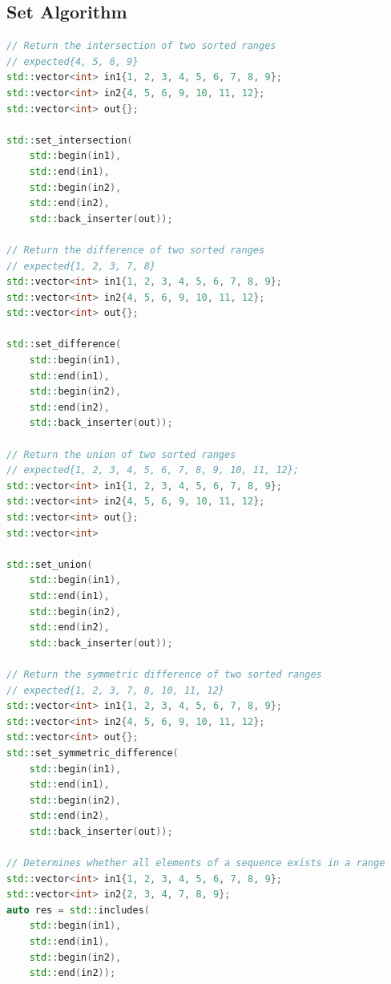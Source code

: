 \subsection{Set Algorithm}
\begin{lstlisting}[language=C++, caption=Set Algorithm]
// Return the intersection of two sorted ranges
// expected{4, 5, 6, 9}
std::vector<int> in1{1, 2, 3, 4, 5, 6, 7, 8, 9};
std::vector<int> in2{4, 5, 6, 9, 10, 11, 12};
std::vector<int> out{};

std::set_intersection(
	std::begin(in1),
	std::end(in1),
	std::begin(in2),
	std::end(in2),
	std::back_inserter(out));
	
// Return the difference of two sorted ranges
// expected{1, 2, 3, 7, 8}
std::vector<int> in1{1, 2, 3, 4, 5, 6, 7, 8, 9};
std::vector<int> in2{4, 5, 6, 9, 10, 11, 12};
std::vector<int> out{};

std::set_difference(
	std::begin(in1),
	std::end(in1),
	std::begin(in2),
	std::end(in2),
	std::back_inserter(out));
	
// Return the union of two sorted ranges
// expected{1, 2, 3, 4, 5, 6, 7, 8, 9, 10, 11, 12};
std::vector<int> in1{1, 2, 3, 4, 5, 6, 7, 8, 9};
std::vector<int> in2{4, 5, 6, 9, 10, 11, 12};
std::vector<int> out{};
std::vector<int> 

std::set_union(
	std::begin(in1),
	std::end(in1),
	std::begin(in2),
	std::end(in2),
	std::back_inserter(out));
	
// Return the symmetric difference of two sorted ranges
// expected{1, 2, 3, 7, 8, 10, 11, 12}
std::vector<int> in1{1, 2, 3, 4, 5, 6, 7, 8, 9};
std::vector<int> in2{4, 5, 6, 9, 10, 11, 12};
std::vector<int> out{};
std::set_symmetric_difference(
	std::begin(in1),
	std::end(in1),
	std::begin(in2),
	std::end(in2),
	std::back_inserter(out));
	
// Determines whether all elements of a sequence exists in a range
std::vector<int> in1{1, 2, 3, 4, 5, 6, 7, 8, 9};
std::vector<int> in2{2, 3, 4, 7, 8, 9};
auto res = std::includes(
	std::begin(in1),
	std::end(in1),
	std::begin(in2),
	std::end(in2));
\end{lstlisting}

